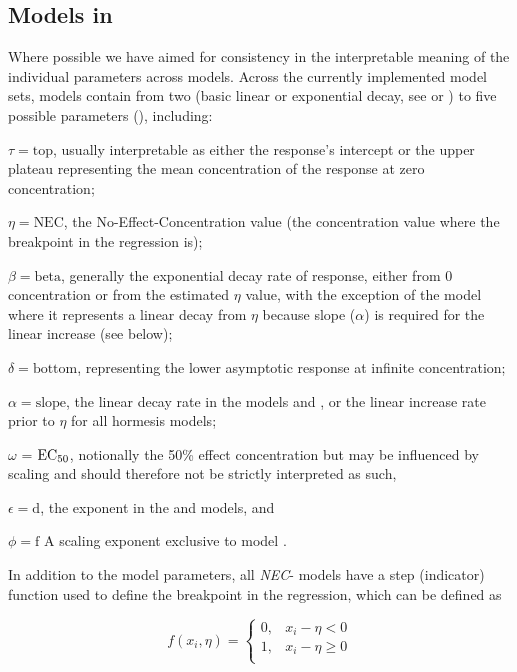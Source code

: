 \documentclass[
  shortnames]{jss}
\begin{document}
\subsection[Models in bayesnec]{Models in }\label{mdbnc}

Where possible we have aimed for consistency in the interpretable meaning of the individual parameters across models. Across the currently implemented model sets, models contain from two (basic linear or exponential decay, see  or ) to five possible parameters (), including:

\(\tau = \text{top}\), usually interpretable as either the response's intercept or the upper plateau representing the mean concentration of the response at zero concentration;

\(\eta = \text{NEC}\), the No-Effect-Concentration value (the concentration value where the breakpoint in the regression is);

\(\beta = \text{beta}\), generally the exponential decay rate of response, either from 0 concentration or from the estimated \(\eta\) value, with the exception of the  model where it represents a linear decay from \(\eta\) because slope (\(\alpha\)) is required for the linear increase (see below);

\(\delta = \text{bottom}\), representing the lower asymptotic response at infinite concentration;

\(\alpha = \text{slope}\), the linear decay rate in the models  and , or the linear increase rate prior to \(\eta\) for all hormesis models;

\(\omega\) = \(\text{EC\textsubscript{50}}\), notionally the 50\% effect concentration but may be influenced by scaling and should therefore not be strictly interpreted as such,

\(\epsilon = \text{d}\), the exponent in the  and  models, and

\(\phi = \text{f}\) A scaling exponent exclusive to model .

In addition to the model parameters, all \emph{NEC}- models have a step (indicator) function used to define the breakpoint in the regression, which can be defined as

\[
f(x_i, \eta) = \begin{cases} 
      0, & x_i - \eta < 0 \\
      1, & x_i - \eta \geq 0 \\
   \end{cases}
\]
\end{document}

